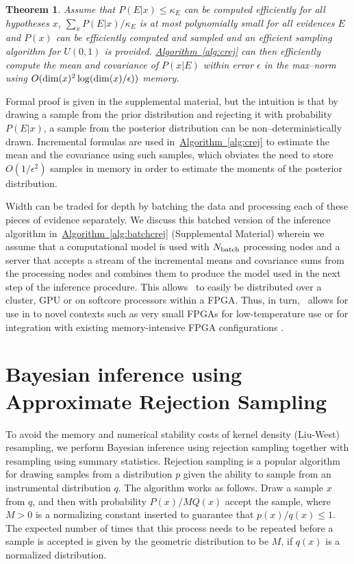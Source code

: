 \documentclass[twoside]{article}
\newtheorem{theorem}{Theorem}
\newcommand{\alg}[1]{\hyperref[alg:#1]{Algorithm~\ref*{alg:#1}}}
\newcommand{\CRej}{\text{rejection filtering}}
\begin{document}
\begin{theorem}
Assume that $P(E|x)\le \kappa_E$ can be computed efficiently for all hypotheses $x$, $\sum_x P(E|x)/\kappa_E$ is at most polynomially small for all
evidences $E$ and $P(x)$ can be efficiently computed and sampled and an efficient sampling algorithm for $U(0,1)$ is provided.  \alg{crej} 
can then efficiently compute the mean and covariance of $P(x|E)$ within error $\epsilon$ in the max--norm using $O({\rm dim}(x)^2\log({\rm dim}(x)/\epsilon))$ memory.\label{thm:crej}
\end{theorem}
Formal proof is given in the supplemental material, but the intuition is that by drawing a
sample from the prior distribution and rejecting it with probability $P(E|x)$, a sample from
the posterior distribution can be non--deterministically drawn.  Incremental formulas are
used in~\alg{crej} to estimate the mean and the covariance using such samples, which obviates the need
to store $O(1/\epsilon^2)$ samples in memory in order to estimate the moments of the posterior distribution.

Width can be traded for depth by batching the data and processing each of
these pieces of evidence separately. We discuss this batched version of the
inference algorithm in~\alg{batchcrej} (Supplemental Material) wherein we
assume that a computational model is used with $N_{\rm batch}$ processing
nodes and a server that accepts a stream of the incremental means and
covariance sums from the processing nodes and combines them to produce the
model used in the next step of the inference procedure. This allows \CRej~to
easily be distributed over a cluster, GPU or on softcore processors within a
FPGA. Thus, in turn, \CRej~allows for use in to novel contexts such as very
small FPGAs for low-temperature use \cite{hornibrook_cryogenic_2015} or for
integration with existing memory-intensive FPGA configurations
\cite{casagrande_design_2014}.



\section{ Bayesian inference using Approximate Rejection Sampling}

To avoid the memory and numerical stability costs of kernel density (Liu-West)
resampling, we perform Bayesian inference using rejection sampling together
with resampling using summary statistics. Rejection sampling is a
popular algorithm for drawing samples from a distribution $p$ given the
ability to sample from an instrumental distribution $q$.  The algorithm works
as follows. Draw a sample  $x$ from $q$, and then with probability $P(x)/M
Q(x)$ accept the sample, where $M > 0$ is a normalizing constant inserted to
guarantee that $p(x)/q(x) \le 1$.  The expected number of times that this
process needs to be repeated before a sample is accepted is given by the
geometric distribution to be $M$, if $q(x)$ is a normalized distribution.
\end{document}
